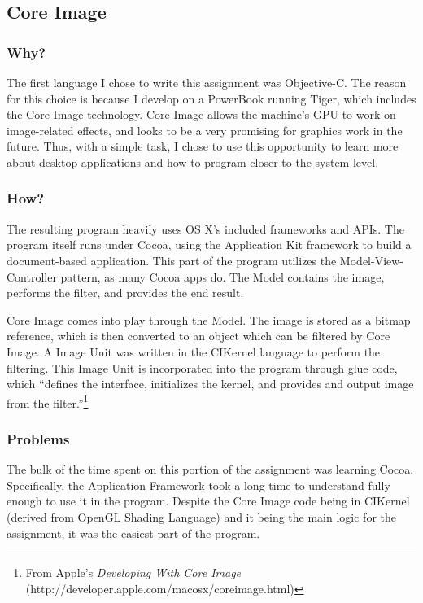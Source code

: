 \documentclass[11pt]{article}
\begin{document}
\subsection{Core Image}

\subsubsection{Why?}

The first language I chose to write this assignment was Objective-C. The reason for this choice is because I develop on a PowerBook running Tiger, which includes the Core Image technology. Core Image allows the machine's GPU to work on image-related effects, and looks to be a very promising for graphics work in the future. Thus, with a simple task, I chose to use this opportunity to learn more about desktop applications and how to program closer to the system level.

\subsubsection{How?}

The resulting program heavily uses OS X's included frameworks and APIs. The program itself runs under Cocoa, using the Application Kit framework to build a document-based application. This part of the program utilizes the Model-View-Controller pattern, as many Cocoa apps do. The Model contains the image, performs the filter, and provides the end result.

Core Image comes into play through the Model. The image is stored as a bitmap reference, which is then converted to an object which can be filtered by Core Image. A Image Unit was written in the CIKernel language to perform the filtering. This Image Unit is incorporated into the program through glue code, which ``defines the interface, initializes the kernel, and provides and output image from the filter.''\footnote{From Apple's \emph{Developing With Core Image} (http://developer.apple.com/macosx/coreimage.html)}

\subsubsection{Problems}

The bulk of the time spent on this portion of the assignment was learning Cocoa. Specifically, the Application Framework took a long time to understand fully enough to use it in the program. Despite the Core Image code being in CIKernel (derived from OpenGL Shading Language) and it being the main logic for the assignment, it was the easiest part of the program.
\end{document}
